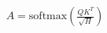 \documentclass[preview]{standalone}
\begin{document}
\begin{align*}
A = \text{softmax}\!\left(\frac{QK^T}{\sqrt{H}}\right)
\end{align*}
\end{document}
